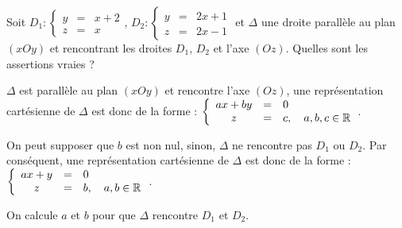\begin{question} 

Soit  $D_1 : \left\{\begin{array}{ccl}y&=&x+2\\z&=&x \end{array}\right.$,   
$D_2 : \left\{\begin{array}{ccl}y&=&2x+1\\z&=&2x-1 \end{array}\right.$ et $\Delta$ une droite parallèle au plan $(xOy)$ et rencontrant les droites $D_1$, $D_2$ et l'axe $(Oz)$. 
Quelles sont les assertions vraies ?
\begin{answers}

 
    
   
   
\end{answers}
\begin{explanations}
$\Delta$ est parallèle au plan $(xOy)$ et rencontre l'axe  $(Oz)$, une représentation cartésienne de $\Delta$ est donc  de la forme : 
$ \left\{\begin{array}{ccl}ax+by&=&0\\z&=&c, \quad a,b,c \in \mathbb{R} \end{array}\right.$. 

 On peut supposer que $b$ est non nul, sinon, $\Delta$ ne rencontre pas $D_1$ ou $D_2$. Par conséquent, une représentation cartésienne de $\Delta$ est donc  de la forme : 
$ \left\{\begin{array}{ccl}ax+y&=&0\\z&=&b, \quad a,b \in \mathbb{R} \end{array}\right.$.

 On calcule $a$ et $b$ pour que $\Delta$ rencontre $D_1$ et $D_2$.
\end{explanations}

\end{question}

